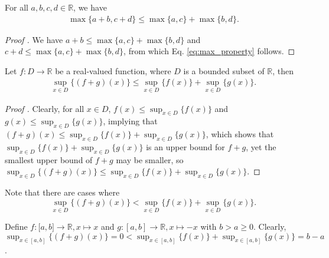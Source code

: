 \begin{theorem}\label{thrm:max_property}
	For all $a, b, c, d\in\mathbb R$, we have 
	\begin{align}\label{eq:max_property}
		\max\{a + b, c + d\} \leq \max\{a, c\} + \max\{b, d\}.
	\end{align}
\end{theorem}

\begin{proof}[Proof \cite{1975962}]
	We have $a + b \leq \max\{a, c\} + \max\{b, d\}$ and $c + d \leq \max\{a, c\} + \max\{b, d\}$, from which Eq. \eqref{eq:max_property} follows.
\end{proof}

\begin{theorem}\label{thrm:sup_inequality}
	Let $f: D\to \mathbb R$ be a real-valued function, where $D$ is a bounded subset of $\mathbb R$, then 
	\begin{align}
		\sup_{x\in D}\{(f + g)(x)\} \leq \sup_{x\in D}\{f(x)\} + \sup_{x\in D}\{g(x)\}.
	\end{align}
\end{theorem}

\begin{proof}[Proof \cite{207335, 207339}]
	Clearly, for all $x\in D$, $f(x) \leq \sup_{x\in D}\{f(x)\}$ and $g(x) \leq \sup_{x\in D}\{g(x)\}$, implying that $(f+g)(x) \leq \sup_{x\in D}\{f(x)\} + \sup_{x\in D}\{g(x)\}$, which shows that $\sup_{x\in D}\{f(x)\} + \sup_{x\in D}\{g(x)\}$ is an upper bound for $f+g$, yet the smallest upper bound of $f+g$ may be smaller, so $\sup_{x\in D}\{(f + g)(x)\} \leq \sup_{x\in D}\{f(x)\} + \sup_{x\in D}\{g(x)\}$.
\end{proof}

\begin{remark}
	Note that there are cases where $$\sup_{x\in D}\{(f + g)(x)\} < \sup_{x\in D}\{f(x)\} + \sup_{x\in D}\{g(x)\}.$$
\end{remark}

\begin{exmp}
	Define $f: \mathbb [a, b]\to\mathbb R, x\mapsto x$ and $g: [a, b]\to\mathbb R, x\mapsto -x$ with $b > a\geq 0$. Clearly, $\sup_{x\in [a, b]}\{(f+g)(x)\} = 0 < \sup_{x\in [a, b]}\{f(x)\} + \sup_{x\in [a, b]}\{g(x)\} = b - a$. 
\end{exmp}